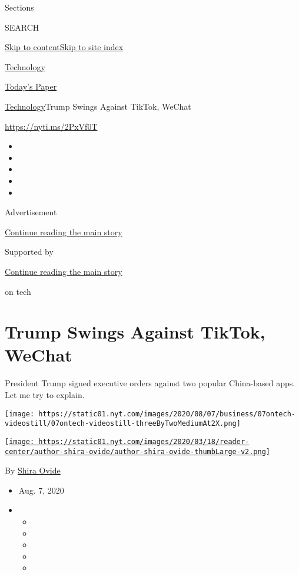 Sections

SEARCH

\protect\hyperlink{site-content}{Skip to
content}\protect\hyperlink{site-index}{Skip to site index}

\href{https://www.nytimes.com/section/technology}{Technology}

\href{https://myaccount.nytimes.com/auth/login?response_type=cookie\&client_id=vi}{}

\href{https://www.nytimes.com/section/todayspaper}{Today's Paper}

\href{/section/technology}{Technology}\textbar{}Trump Swings Against
TikTok, WeChat

\href{https://nyti.ms/2PxVf0T}{https://nyti.ms/2PxVf0T}

\begin{itemize}
\item
\item
\item
\item
\item
\end{itemize}

Advertisement

\protect\hyperlink{after-top}{Continue reading the main story}

Supported by

\protect\hyperlink{after-sponsor}{Continue reading the main story}

on tech

\hypertarget{trump-swings-against-tiktok-wechat}{%
\section{Trump Swings Against TikTok,
WeChat}\label{trump-swings-against-tiktok-wechat}}

President Trump signed executive orders against two popular China-based
apps. Let me try to explain.

\texttt{[image: https://static01.nyt.com/images/2020/08/07/business/07ontech-videostill/07ontech-videostill-threeByTwoMediumAt2X.png]}

\href{https://www.nytimes.com/by/shira-ovide}{\texttt{[image: https://static01.nyt.com/images/2020/03/18/reader-center/author-shira-ovide/author-shira-ovide-thumbLarge-v2.png]}}

By \href{https://www.nytimes.com/by/shira-ovide}{Shira Ovide}

\begin{itemize}
\item
  Aug. 7, 2020
\item
  \begin{itemize}
  \item
  \item
  \item
  \item
  \item
  \end{itemize}
\end{itemize}

